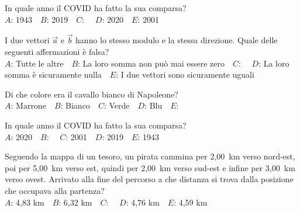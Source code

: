 \mcquestionfooter



\def\mcquestionnumber{11}


\mcquestionheader In quale anno il COVID ha fatto la sua comparsa?\\
{$A$}: 1943\ \ {$B$}: 2019\ \ {$C$}: \ \ {$D$}: 2020\ \ {$E$}: 2001\ \ 

\mcquestionfooter



\def\mcquestionnumber{12}


\mcquestionheader I due vettori $\vec{a}$ e $\vec{b}$ hanno lo stesso modulo e la stessa direzione. Quale delle seguenti affermazioni è falsa?\\
{$A$}: Tutte le altre\ \ {$B$}: La loro somma non può mai essere zero\ \ {$C$}: \ \ {$D$}: La loro somma è sicuramente nulla\ \ {$E$}: I due vettori sono sicuramente uguali\ \ 

\mcquestionfooter



\mcpaperfooter

\def\mcserialnumber{20}
\mcpaperheader


\def\mcquestionnumber{1}


\mcquestionheader Di che colore era il cavallo bianco di Napoleone?\\
{$A$}: Marrone\ \ {$B$}: Bianco\ \ {$C$}: Verde\ \ {$D$}: Blu\ \ {$E$}: \ \ 

\mcquestionfooter



\def\mcquestionnumber{2}


\mcquestionheader In quale anno il COVID ha fatto la sua comparsa?\\
{$A$}: 2020\ \ {$B$}: \ \ {$C$}: 2001\ \ {$D$}: 2019\ \ {$E$}: 1943\ \ 

\mcquestionfooter



\def\mcquestionnumber{3}


\mcquestionheader Seguendo la mappa di un tesoro, un pirata cammina per 2,00~km verso nord-est, poi per 5,00~km verso est, quindi per 2,00~km verso sud-est e infine per 3,00~km verso ovest. Arrivato alla fine del percorso a che distanza si trova dalla posizione che occupava alla partenza?\\
{$A$}: 4,83 km\ \ {$B$}: 6,32 km\ \ {$C$}: \ \ {$D$}: 4,76 km\ \ {$E$}: 4,59 km\ \ 

\mcquestionfooter



